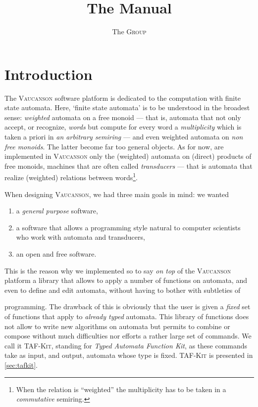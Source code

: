 \documentclass[a4paper]{report}
\title{The \Vauc \TFKv Manual}
\author{The \Vauc \textsc{Group}}
\makeatletter
\newcommand{\Cxx}{%
  \valign{\vfil\hbox{##}\vfil\cr
    {C\kern-.1em}\cr
    $\hbox{\fontsize\sf@size\z@\textbf{+\kern-0.05em+}}$\cr}%
    \xspace
}
\newcommand{\tafkit}{\textsc{TAF-Kit}\xspace}
\newcommand{\Vauc}{\textsc{Vaucanson}\xspace}
\makeatother
\begin{document}
\maketitle

\setcounter{tocdepth}{2}
\tableofcontents

\chapter*{Introduction}
\label{sec:intro}

The \Vauc software platform is dedicated to the computation with
finite state automata.  Here, `finite state automata' is to be
understood in the broadest sense: \emph{weighted} automata on a free
monoid --- that is, automata that not only accept, or recognize,
\emph{words} but compute for every word a \emph{multiplicity} which is
taken a priori in \emph{an arbitrary semiring} --- and even weighted
automata on \emph{non free monoids}.  The latter become far too
general objects.  As for now, are implemented in \Vauc only the
(weighted) automata on (direct) products of free monoids, machines
that are often called \emph{transducers} --- that is automata that
realize (weighted) relations between words\footnote{When the relation
  is ``weighted'' the multiplicity has to be taken in a
  \emph{commutative} semiring.}.

When designing \Vauc, we had three main goals in mind: we wanted
\begin{enumerate}
\item a \emph{general purpose} software,
\item a software that allows a programming style natural to computer
  scientists who work with automata and transducers,
\item  an open and free software.
\end{enumerate}

This is the reason why we implemented so to say \emph{on top} of the
\Vauc platform a library that allows to apply a number of functions on
automata, and even to define and edit automata, without having to
bother with subtleties of \Cxx programming.  The drawback of this is
obviously that the user is given a \emph{fixed} set of functions that
apply to \emph{already typed} automata.  This library of functions
does not allow to write new algorithms on automata but permits to
combine or compose without much difficulties nor efforts a rather
large set of commands.  We call it \tafkit, standing for \emph{Typed
  Automata Function Kit}, as these commands take as input, and output,
automata whose type is fixed.  \tafkit is presented in
\autoref{sec:tafkit}.
\end{document}
